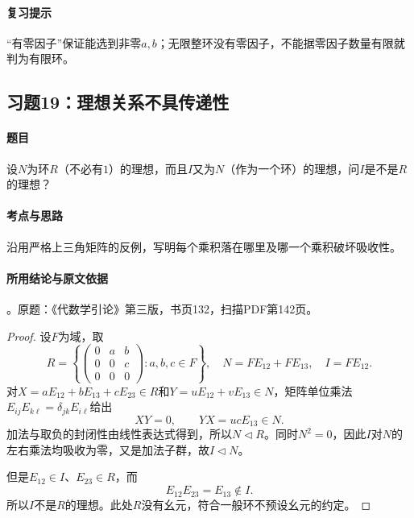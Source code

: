 \paragraph{复习提示}

“有零因子”保证能选到非零$a,b$；无限整环没有零因子，不能据零因子数量有限就判为有限环。



\subsection{习题19：理想关系不具传递性}

\label{ex:3:19}

\paragraph{题目}

设$N$为环$R$（不必有$1$）的理想，而且$I$又为$N$（作为一个环）的理想，问$I$是不是$R$的理想？

\paragraph{考点与思路}

沿用严格上三角矩阵的反例，写明每个乘积落在哪里及哪一个乘积破坏吸收性。

\paragraph{所用结论与原文依据}

。原题：《代数学引论》第三版，书页132，扫描PDF第142页。


\begin{proof}

设$F$为域，取
\[
R=\left\{\begin{pmatrix}0&a&b\\0&0&c\\0&0&0\end{pmatrix}:a,b,c\in F\right\},\quad
N=FE_{12}+FE_{13},\quad I=FE_{12}.
\]
对$X=aE_{12}+bE_{13}+cE_{23}\in R$和$Y=uE_{12}+vE_{13}\in N$，矩阵单位乘法$E_{ij}E_{k\ell}=\delta_{jk}E_{i\ell}$给出
\[
XY=0,\qquad YX=ucE_{13}\in N.
\]
加法与取负的封闭性由线性表达式得到，所以$N\lhd R$。同时$N^2=0$，因此$I$对$N$的左右乘法均吸收为零，又是加法子群，故$I\lhd N$。

但是$E_{12}\in I$、$E_{23}\in R$，而
\[
E_{12}E_{23}=E_{13}\notin I.
\]
所以$I$不是$R$的理想。此处$R$没有幺元，符合一般环不预设幺元的约定。

\end{proof}

